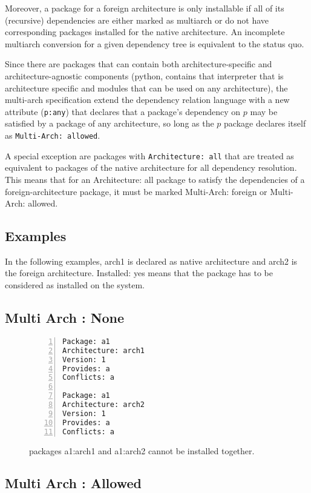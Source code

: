 Moreover, a package for a foreign architecture is only installable if
all of its (recursive) dependencies are either marked as multiarch or
do not have corresponding packages installed for the native
architecture. An incomplete multiarch conversion for a given
dependency tree is equivalent to the status quo. 

Since there are packages that can contain both architecture-specific
and architecture-agnostic components (python, contains that
interpreter that is architecture specific and modules that can be used
on any architecture), the multi-arch specification extend the
dependency relation language with a new attribute (\texttt{p:any})
that declares that a package's dependency on $p$ may be satisfied by a
package of any architecture, so long as the $p$ package declares
itself as \texttt{Multi-Arch: allowed}. 

A special exception are packages with \texttt{Architecture: all} that
are treated as equivalent to packages of the native architecture for
all dependency resolution. This means that for an Architecture: all
package to satisfy the dependencies of a foreign-architecture package,
it must be marked Multi-Arch: foreign or Multi-Arch: allowed. 

\subsection{Examples}

In the following examples, arch1 is declared as native architecture and arch2
is the foreign architecture. Installed: yes means that the package has
to be considered as installed on the system.

\subsection{Multi Arch : None}

\begin{figure}
\begin{lstlisting}[style=debctrl,numbers=left,xleftmargin=20pt,basicstyle=\footnotesize\normalfont\ttfamily]
Package: a1
Architecture: arch1
Version: 1
Provides: a
Conflicts: a

Package: a1
Architecture: arch2
Version: 1
Provides: a
Conflicts: a
\end{lstlisting}
\caption{packages a1:arch1 and a1:arch2 cannot be installed together.}
\label{fig:arch-none}
\end{figure}

\subsection{Multi Arch : Allowed}

